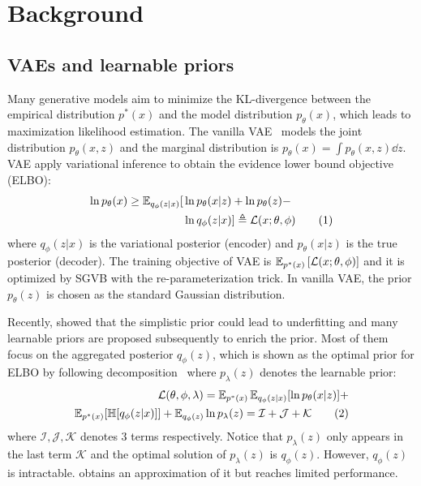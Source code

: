 \section{Background}

\subsection{VAEs and learnable priors}

Many generative models aim to minimize the KL-divergence between the empirical distribution $p^*(x)$ and the model distribution $p_\theta(x)$, which leads to maximization likelihood estimation. The vanilla VAE~\cite{kingma2014auto} models the joint distribution $p_\theta(x, z)$ and the marginal distribution is $p_\theta(x) = \int p_\theta(x, z) \dd z$. VAE apply variational inference to obtain the evidence lower bound objective (ELBO): 
\begin{align*} \label{eq:ELBO}
\ln p_\theta(x) \geq \operatorname{\mathbb{E}}_{q_\phi(z|x)} [  &  \ln p_\theta(x|z) + \ln p_\theta(z) - \\ & \ln q_\phi(z|x) ] 
\triangleq \mathcal{L}(x; \theta, \phi) \tag{1}
\end{align*}
where $q_\phi(z|x)$ is the variational posterior (encoder) and $p_\theta(x|z)$ is the true posterior (decoder). The training objective of VAE is $\operatorname{\mathbb{E}}_{{p^*(x)}}\left[{\mathcal{L}(x; \theta, \phi)}\right]$ and it is optimized by SGVB with the re-parameterization trick. In vanilla VAE, the prior $p_\theta(z)$ is chosen as the standard Gaussian distribution. 

Recently, \cite{tomczak2018vae} showed that the simplistic prior could lead to underfitting and many learnable priors are proposed subsequently to enrich the prior. Most of them focus on the aggregated posterior $q_\phi(z)$, which is shown as the optimal prior for ELBO by following decomposition~\cite{tomczak2018vae} where $p_\lambda(z)$ denotes the learnable prior:
\begin{align*} \label{eq:second-decomposition}
\mathcal{L}(\theta, \phi, \lambda) = \operatorname{\mathbb{E}}_{p^*(x)}\operatorname{\mathbb{E}}_{q_\phi(z|x)} [ \ln p_\theta(x|z)] + \\ 
\operatorname{\mathbb{E}}_{p^*(x)}[\mathbb{H}[q_\phi(z|x)]] + \operatorname{\mathbb{E}}_{q_\phi(z)} \ln p_\lambda(z) = \mathcal{I} + \mathcal{J} + \mathcal{K} \tag{2}
\end{align*}
where $\mathcal{I}, \mathcal{J}, \mathcal{K}$ denotes 3 terms respectively. 
Notice that $p_\lambda(z)$ only appears in the last term $\mathcal{K}$ and the optimal solution of $p_\lambda(z)$ is $q_\phi(z)$. However, $q_\phi(z)$ is intractable. \cite{tomczak2018vae,takahashi2019variational} obtains an approximation of it but reaches limited performance. 


